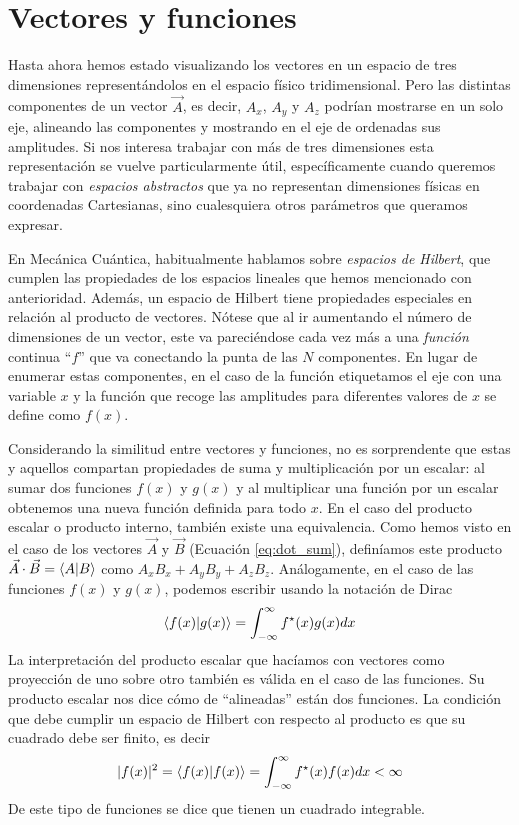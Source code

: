 \documentclass{tufte-handout}
\begin{document}
\section{Vectores y funciones}
Hasta ahora hemos estado visualizando los vectores en un espacio de 
tres dimensiones representándolos en el espacio físico tridimensional.
Pero las distintas componentes de un vector $\vec{A}$, es decir, 
$A_x$, $A_y$ y $A_z$ podrían mostrarse en un solo eje, alineando
las componentes y mostrando en el eje de ordenadas sus amplitudes. 
Si nos interesa trabajar con más de tres dimensiones esta representación
se vuelve particularmente útil, específicamente cuando queremos
trabajar con \textit{espacios abstractos} que ya no representan 
dimensiones físicas en coordenadas Cartesianas, sino cualesquiera
otros parámetros que queramos expresar.

En Mecánica Cuántica, habitualmente hablamos
sobre \textit{espacios de Hilbert}, que cumplen las propiedades de los
espacios lineales que hemos mencionado con
anterioridad. Además, un espacio de Hilbert
tiene propiedades especiales en relación
al producto de vectores. Nótese que al ir aumentando el número de dimensiones de un vector,
este va pareciéndose cada vez más a una \textit{función} continua ``$f$'' que va
conectando la punta de las $N$
componentes. En lugar de enumerar estas 
componentes, en el caso de la función etiquetamos
el eje con una variable $x$ y la función que
recoge las amplitudes para diferentes valores de $x$ se define como $f(x)$.

Considerando la similitud entre vectores y
funciones, no es sorprendente que estas y 
aquellos compartan propiedades de suma y 
multiplicación por un escalar: al sumar
dos funciones $f(x)$ y $g(x)$ y al multiplicar
una función por un escalar obtenemos
una nueva función definida para todo $x$.
En el caso del producto escalar o producto
interno, también existe una equivalencia.
Como hemos visto en el caso de los vectores
$\vec{A}$ y $\vec{B}$
(Ecuación \ref{eq:dot_sum}), definíamos
este producto $\vec{A}\cdot\vec{B}=\braket{A}{B}$ como $A_xB_x + A_yB_y + A_zB_z$.
Análogamente, en el caso de las funciones $f(x)$
y $g(x)$, podemos escribir usando la 
notación de Dirac
\begin{equation}
    \braket{f(x)}{g(x)}=\int_{-\infty}^\infty f^\star(x)g(x)dx
\end{equation}
La interpretación del producto escalar que hacíamos con vectores como proyección de uno
sobre otro también es válida en el caso de las
funciones. Su producto escalar nos dice cómo
de ``alineadas'' están dos funciones. La 
condición que debe cumplir un espacio de Hilbert
con respecto al producto es que su cuadrado 
debe ser finito, es decir
\begin{equation}
    |f(x)|^2=\braket{f(x)}{f(x)}=\int_{-\infty}^\infty f^\star(x)f(x)dx<\infty
\end{equation}
De este tipo de funciones se dice que tienen un
cuadrado integrable.
\end{document}
